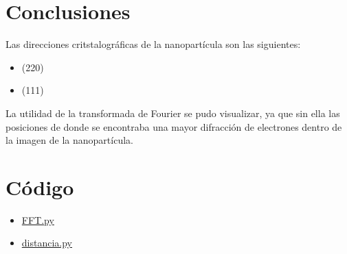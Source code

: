 \documentclass[reprint,amsmath,amssymb,aps,]{revtex4-2}
\begin{document}
\section{Conclusiones}
Las direcciones critstalográficas de la nanopartícula son las siguientes:
\begin{itemize}
    \vspace{-1cm}
    \item (220)
    \vspace{-1cm}
    \item (111)
\end{itemize}
La utilidad de la transformada de Fourier se pudo visualizar, ya que sin ella las posiciones de donde se encontraba una mayor difracción
de electrones dentro de la imagen de la nanopartícula.
\section{Código}
\begin{itemize}
    \item \href{https://github.com/giovannilopez9808/Notas_Agosto_2020/blob/master/AMC/Reto2/FFT.py}{FFT.py}
    \item \href{https://github.com/giovannilopez9808/Notas_Agosto_2020/blob/master/AMC/Reto2/distancia.py}{distancia.py}
\end{itemize}

\nocite{*}

\end{document}
